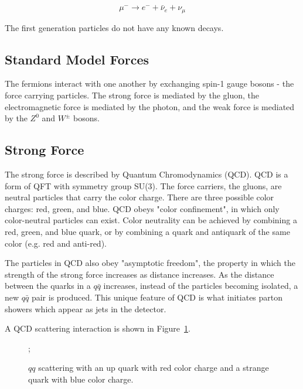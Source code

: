 \begin{equation}
	\mu^{-} \rightarrow e^{-} + \bar{\nu}_e + \nu_\mu
\end{equation}

 The first generation particles do not have any known decays.


\subsection{Standard Model Forces}

The fermions interact with one another by exchanging spin-1 gauge bosons - the force carrying particles. The strong force is mediated by the gluon, the electromagnetic force is mediated by the photon, and the weak force is mediated by the $Z^0$ and $W^{\pm}$ bosons. 

\subsection*{Strong Force}

The strong force is described by Quantum Chromodynamics (QCD). QCD is a form of QFT with symmetry group SU(3). The force carriers, the gluons, are neutral particles that carry the color charge. There are three possible color charges: red, green, and blue. QCD obeys "color confinement", in which only color-neutral particles can exist. Color neutrality can be achieved by combining a red, green, and blue quark, or by combining a quark and antiquark of the same color (e.g. red and anti-red).

The particles in QCD also obey "asymptotic freedom", the property in which the strength of the strong force increases as distance increases. As the distance between the quarks in a $q\bar{q}$ increases, instead of the particles becoming isolated, a new $q\bar{q}$ pair is produced. This unique feature of QCD is what initiates parton showers which appear as jets in the detector.

A QCD scattering interaction is shown in Figure~\ref{fig:feynman_qq}.

\begin{figure}[h!]
	\centering
	;
	\caption{$qq$ scattering with an up quark with red color charge and a strange quark with blue color charge.}
	\label{fig:feynman_qq}
\end{figure} 



